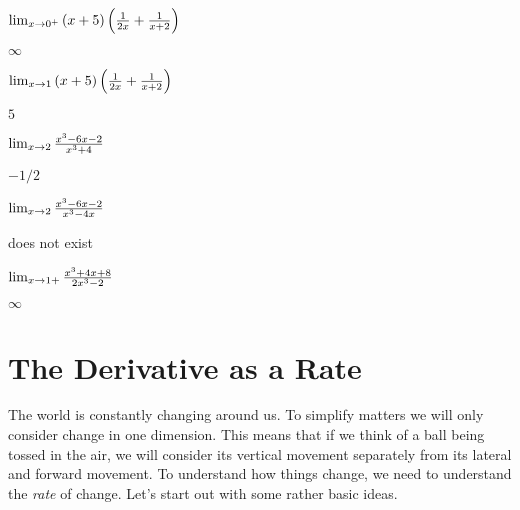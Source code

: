 \begin{exercises}
\begin{exercise} $\lim_{x\to0^+}{(x+5)\left({1\over 2x}+{1\over x+2}\right)}$
\begin{answer} $\infty$
\end{answer}\end{exercise}

\begin{exercise} $\lim_{x\to1}{(x+5)\left({1\over 2x}+{1\over x+2}\right)}$
\begin{answer} $5$
\end{answer}\end{exercise}

\begin{exercise} $\lim_{x\to2}{x^3-6x-2\over x^3+4}$
\begin{answer} $-1/2$
\end{answer}\end{exercise}

\begin{exercise} $\lim_{x\to2}{x^3-6x-2\over x^3-4x}$
\begin{answer} does not exist
\end{answer}\end{exercise}

\begin{exercise} $\lim_{x\to1+}{x^3+4x+8\over 2x^3-2}$
\begin{answer} $\infty$
\end{answer}\end{exercise}
\endtwocol
\end{exercises}








\section{The Derivative as a Rate}

The world is constantly changing around us. To simplify matters we
will only consider change in one dimension. This means that if we
think of a ball being tossed in the air, we will consider its vertical
movement separately from its lateral and forward movement.  To
understand how things change, we need to understand the \textit{rate}
of change. Let's start out with some rather basic ideas.


